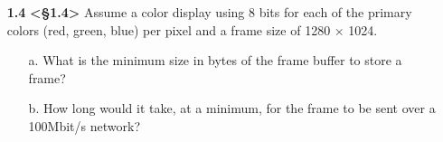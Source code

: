 \documentclass[11pt]{article}
\begin{document}

\begin{enumerate}
    \item[\textbf{1.4}] \textbf{<§1.4>} Assume a color display using 8 bits for each of the primary colors (red, green, blue) per pixel and a frame size of 1280 × 1024.
    \begin{enumerate}
        \item[a.] What is the minimum size in bytes of the frame buffer to store a frame?
        \item[b.] How long would it take, at a minimum, for the frame to be sent over a 100Mbit/s network?
    \end{enumerate}
\end{enumerate}


\end{document}
